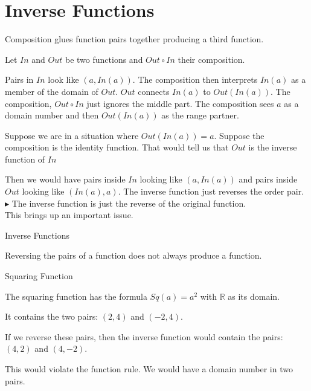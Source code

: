 \documentclass{ximera}
\begin{document}
\section{Inverse Functions}




Composition glues function pairs together producing a third function.

Let $In$ and $Out$ be two functions and $Out \circ In$ their composition.


Pairs in $In$ look like $(a, In(a))$.   The composition then interprets $In(a)$ as a member of the domain of $Out$.  $Out$ connects $In(a)$ to $Out(In(a))$.   The composition, $Out \circ In$ just ignores the middle part.  The composition sees $a$ as a domain number and then $Out(In(a))$ as the range partner.


Suppose we are in a situation where $Out(In(a)) = a$.  Suppose the composition is the identity function.  That would tell us that $Out$ is the inverse function of $In$

Then we would have pairs inside $In$ looking like $(a, In(a))$ and pairs inside $Out$ looking like $(In(a), a)$.  The inverse function just reverses the order pair. \\


\textbf{\textcolor{blue!75!black}{$\blacktriangleright$}}  The inverse function is just the reverse of the original function. \\


This brings up an important issue.


\begin{warning} Inverse Functions

Reversing the pairs of a function does not always produce a function.


\end{warning}




\begin{example} Squaring Function


The squaring function has the formula $Sq(a) =a^2$ with \textbf{$\mathbb{R}$} as its domain.

It contains the two pairs: $(2, 4)$ and $(-2, 4)$.



If we reverse these pairs, then the inverse function would contain the pairs: $(4, 2)$ and $(4,-2)$.

This would violate the function rule.  We would have a domain number in two pairs.

\end{example}
\end{document}
